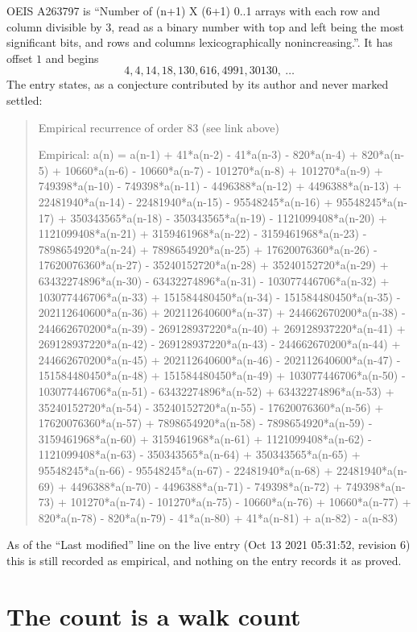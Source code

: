 \documentclass[11pt,a4paper]{article}
\theoremstyle{plain}
\theoremstyle{definition}
\begin{document}
OEIS A263797 is ``Number of (n+1) X (6+1) 0..1 arrays with each row and column divisible by 3, read as a binary number with top and left being the most significant bits, and rows and columns lexicographically nonincreasing.''. It has offset $1$ and begins
\[
4, 4, 14, 18, 130, 616, 4991, 30130,\ \dots
\]
The entry states, as a conjecture contributed by its author and never marked settled:
\begin{quote}\raggedright\small
Empirical recurrence of order 83 (see link above)

Empirical: a(n) = a(n-1) + 41*a(n-2) - 41*a(n-3) - 820*a(n-4) + 820*a(n-5) + 10660*a(n-6) - 10660*a(n-7) - 101270*a(n-8) + 101270*a(n-9) + 749398*a(n-10) - 749398*a(n-11) - 4496388*a(n-12) + 4496388*a(n-13) + 22481940*a(n-14) - 22481940*a(n-15) - 95548245*a(n-16) + 95548245*a(n-17) + 350343565*a(n-18) - 350343565*a(n-19) - 1121099408*a(n-20) + 1121099408*a(n-21) + 3159461968*a(n-22) - 3159461968*a(n-23) - 7898654920*a(n-24) + 7898654920*a(n-25) + 17620076360*a(n-26) - 17620076360*a(n-27) - 35240152720*a(n-28) + 35240152720*a(n-29) + 63432274896*a(n-30) - 63432274896*a(n-31) - 103077446706*a(n-32) + 103077446706*a(n-33) + 151584480450*a(n-34) - 151584480450*a(n-35) - 202112640600*a(n-36) + 202112640600*a(n-37) + 244662670200*a(n-38) - 244662670200*a(n-39) - 269128937220*a(n-40) + 269128937220*a(n-41) + 269128937220*a(n-42) - 269128937220*a(n-43) - 244662670200*a(n-44) + 244662670200*a(n-45) + 202112640600*a(n-46) - 202112640600*a(n-47) - 151584480450*a(n-48) + 151584480450*a(n-49) + 103077446706*a(n-50) - 103077446706*a(n-51) - 63432274896*a(n-52) + 63432274896*a(n-53) + 35240152720*a(n-54) - 35240152720*a(n-55) - 17620076360*a(n-56) + 17620076360*a(n-57) + 7898654920*a(n-58) - 7898654920*a(n-59) - 3159461968*a(n-60) + 3159461968*a(n-61) + 1121099408*a(n-62) - 1121099408*a(n-63) - 350343565*a(n-64) + 350343565*a(n-65) + 95548245*a(n-66) - 95548245*a(n-67) - 22481940*a(n-68) + 22481940*a(n-69) + 4496388*a(n-70) - 4496388*a(n-71) - 749398*a(n-72) + 749398*a(n-73) + 101270*a(n-74) - 101270*a(n-75) - 10660*a(n-76) + 10660*a(n-77) + 820*a(n-78) - 820*a(n-79) - 41*a(n-80) + 41*a(n-81) + a(n-82) - a(n-83)
\end{quote}
As of the ``Last modified'' line on the live entry (Oct 13 2021 05:31:52, revision 6) this is still
recorded as empirical, and nothing on the entry records it as proved.

\section{The count is a walk count}
\end{document}
